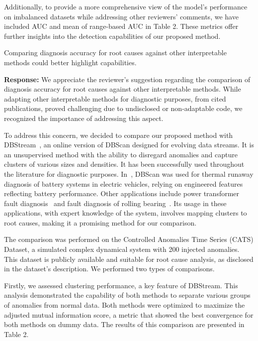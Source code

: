 \documentclass{article}
\makeatletter
\newenvironment{comment}{
\begin{sloppypar}\slshape
\vspace{5 mm}
\color{blue}
 \@beginparpenalty\@M
  \begin{list}{}{\setlength{\topsep}{0ex}%
  \setlength{\leftmargin}{\rightmargin}}\item[]
 \@beginparpenalty\@endparpenalty
}
{\end{list}
\end{sloppypar}
}
\makeatother
\begin{document}
\begin{enumerate}
        Additionally, to provide a more comprehensive view of the model's performance on imbalanced datasets while addressing other reviewers' comments, we have included AUC and mean of range-based AUC in Table 2. These metrics offer further insights into the detection capabilities of our proposed method.
  \item
        \begin{comment}
        Comparing diagnosis accuracy for root causes against other interpretable methods could better highlight capabilities.
        \end{comment}
        {\bf Response:}
        We appreciate the reviewer's suggestion regarding the comparison of diagnosis accuracy for root causes against other interpretable methods. While adapting other interpretable methods for diagnostic purposes, from cited publications, proved challenging due to undisclosed or non-adaptable code, we recognized the importance of addressing this aspect.

        To address this concern, we decided to compare our proposed method with DBStream~\cite{Hahsler2016}, an online version of DBScan designed for evolving data streams. It is an unsupervised method with the ability to disregard anomalies and capture clusters of various sizes and densities. It has been successfully used throughout the literature for diagnostic purposes. In~\cite{Li2019}, DBScan was used for thermal runaway diagnosis of battery systems in electric vehicles, relying on engineered features reflecting battery performance. Other applications include power transformer fault diagnosis~\cite{Liu2020} and fault diagnosis of rolling bearing~\cite{Li2020}.
        Its usage in these applications, with expert knowledge of the system, involves mapping clusters to root causes, making it a promising method for our comparison.

        The comparison was performed on the Controlled Anomalies Time Series (CATS) Dataset, a simulated complex dynamical system with 200 injected anomalies. This dataset is publicly available and suitable for root cause analysis, as disclosed in the dataset's description. We performed two types of comparisons. 
        
        Firstly, we assessed clustering performance, a key feature of DBStream. This analysis demonstrated the capability of both methods to separate various groups of anomalies from normal data. Both methods were optimized to maximize the adjusted mutual information score, a metric that showed the best convergence for both methods on dummy data. The results of this comparison are presented in Table 2.
        

\end{enumerate}
\end{document}
